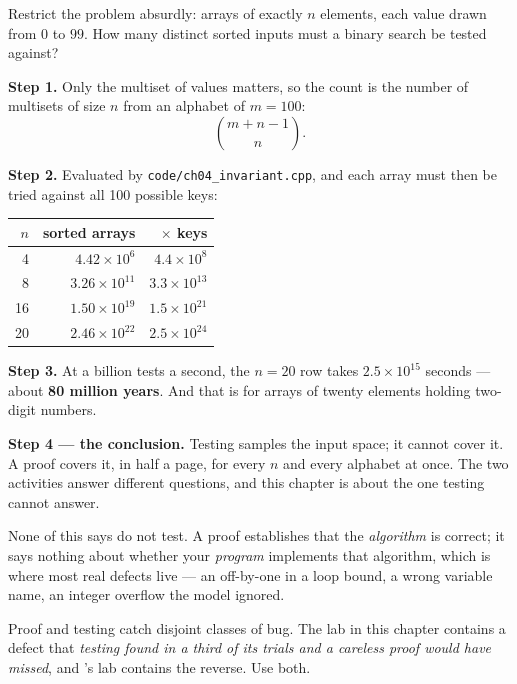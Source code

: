 \begin{worked}
Restrict the problem absurdly: arrays of exactly $n$ elements, each value drawn
from $0$ to $99$. How many distinct sorted inputs must a binary search be
tested against?

\smallskip
\textbf{Step 1.} Only the multiset of values matters, so the count is the number
of multisets of size $n$ from an alphabet of $m = 100$:
\[ \binom{m + n - 1}{n}. \]

\smallskip
\textbf{Step 2.} Evaluated by \texttt{code/ch04\_invariant.cpp}, and each array
must then be tried against all 100 possible keys:

\begin{center}
\begin{tabular}{@{}rrr@{}}
\toprule
\rowcolor{primary!15}
$n$ & sorted arrays & $\times$ keys \\
\midrule
 4 & $4.42 \times 10^{6}$  & $4.4 \times 10^{8}$ \\
 8 & $3.26 \times 10^{11}$ & $3.3 \times 10^{13}$ \\
16 & $1.50 \times 10^{19}$ & $1.5 \times 10^{21}$ \\
20 & $2.46 \times 10^{22}$ & $2.5 \times 10^{24}$ \\
\bottomrule
\end{tabular}
\end{center}

\smallskip
\textbf{Step 3.} At a billion tests a second, the $n = 20$ row takes
$2.5 \times 10^{15}$ seconds --- about \textbf{80 million years}. And that is
for arrays of twenty elements holding two-digit numbers.

\smallskip
\textbf{Step 4 --- the conclusion.} Testing samples the input space; it cannot
cover it. A proof covers it, in half a page, for every $n$ and every alphabet
at once. The two activities answer different questions, and this chapter is
about the one testing cannot answer.
\end{worked}

\begin{conceptbox}
None of this says do not test. A proof establishes that the \emph{algorithm} is
correct; it says nothing about whether your \emph{program} implements that
algorithm, which is where most real defects live --- an off-by-one in a loop
bound, a wrong variable name, an integer overflow the model ignored.

\smallskip
Proof and testing catch disjoint classes of bug. The lab in this chapter
contains a defect that \emph{testing found in a third of its trials and a
careless proof would have missed}, and 's lab contains the reverse.
Use both.
\end{conceptbox}

